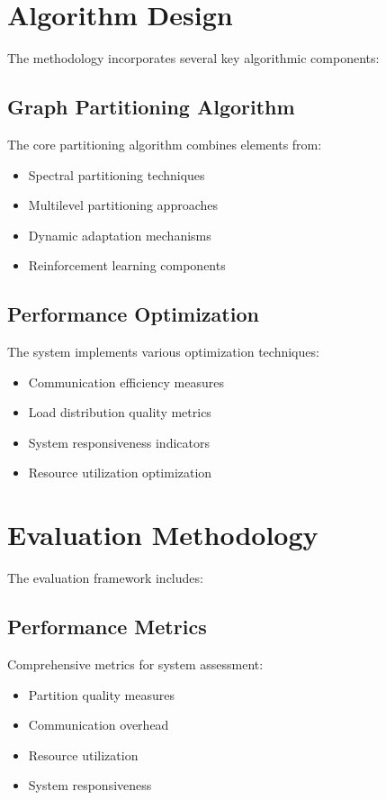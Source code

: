 \section{Algorithm Design}
The methodology incorporates several key algorithmic components:

\subsection{Graph Partitioning Algorithm}
The core partitioning algorithm combines elements from:
\begin{itemize}
    \item Spectral partitioning techniques
    \item Multilevel partitioning approaches
    \item Dynamic adaptation mechanisms
    \item Reinforcement learning components
\end{itemize}

\subsection{Performance Optimization}
The system implements various optimization techniques:
\begin{itemize}
    \item Communication efficiency measures
    \item Load distribution quality metrics
    \item System responsiveness indicators
    \item Resource utilization optimization
\end{itemize}

\section{Evaluation Methodology}
The evaluation framework includes:

\subsection{Performance Metrics}
Comprehensive metrics for system assessment:
\begin{itemize}
    \item Partition quality measures
    \item Communication overhead
    \item Resource utilization
    \item System responsiveness
\end{itemize}

